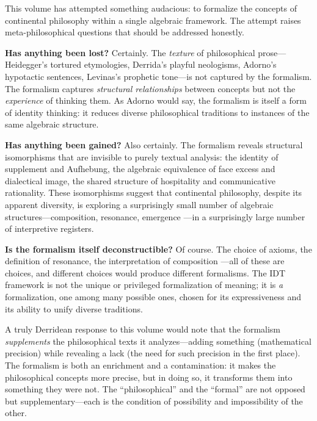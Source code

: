 \begin{remark}
\label{rem:meta-philosophical}
This volume has attempted something audacious: to formalize the concepts of
continental philosophy within a single algebraic framework. The attempt
raises meta-philosophical questions that should be addressed honestly.

\textbf{Has anything been lost?} Certainly. The \emph{texture} of
philosophical prose---Heidegger's tortured etymologies, Derrida's
playful neologisms, Adorno's hypotactic sentences, Levinas's prophetic
tone---is not captured by the formalism. The formalism captures
\emph{structural relationships} between concepts but not the \emph{experience}
of thinking them. As Adorno would say, the formalism is itself a form of
identity thinking: it reduces diverse philosophical traditions to instances
of the same algebraic structure.

\textbf{Has anything been gained?} Also certainly. The formalism reveals
structural isomorphisms that are invisible to purely textual analysis:
the identity of supplement and Aufhebung, the algebraic equivalence of
face excess and dialectical image, the shared structure of hospitality
and communicative rationality. These isomorphisms suggest that continental
philosophy, despite its apparent diversity, is exploring a surprisingly
small number of algebraic structures---composition, resonance, emergence
---in a surprisingly large number of interpretive registers.

\textbf{Is the formalism itself deconstructible?} Of course. The choice of
axioms, the definition of resonance, the interpretation of composition
---all of these are choices, and different choices would produce different
formalisms. The IDT framework is not the unique or privileged formalization
of meaning; it is \emph{a} formalization, one among many possible ones,
chosen for its expressiveness and its ability to unify diverse traditions.

A truly Derridean response to this volume would note that the formalism
\emph{supplements} the philosophical texts it analyzes---adding something
(mathematical precision) while revealing a lack (the need for such precision
in the first place). The formalism is both an enrichment and a contamination:
it makes the philosophical concepts more precise, but in doing so, it
transforms them into something they were not. The ``philosophical'' and the
``formal'' are not opposed but supplementary---each is the condition of
possibility and impossibility of the other.
\end{remark}

